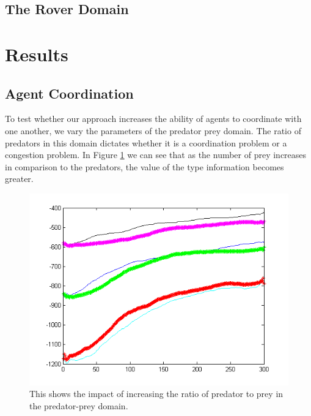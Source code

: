 \documentclass{aamas2014}
\begin{document}
\subsection{The Rover Domain}




\section{Results}
\label{sec:results}

\subsection{Agent Coordination}

To test whether our approach increases the ability of agents to coordinate with one another, we vary the parameters of the predator prey domain. The ratio of predators in this domain dictates whether it is a coordination problem or a congestion problem. In Figure \ref{fig:ratio} we can see that as the number of prey increases in comparison to the predators, the value of the type information becomes greater. 

\begin{figure}[h!]
\includegraphics[width=.5\textwidth]{pics/ratio_20a}
\caption{This shows the impact of increasing the ratio of predator to prey in the predator-prey domain.}
\label{fig:ratio}
\end{figure}

\end{document}
